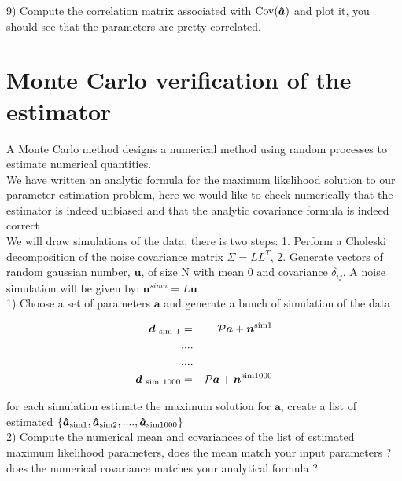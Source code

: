 \documentclass[a4paper]{article}
\def\ba{\begin{eqnarray}}
\def\ea{\end{eqnarray}}
\begin{document}
9) Compute the correlation matrix associated with ${\rm Cov}(\bm{\hat{a}}) $ and plot it, you should see that the parameters are pretty correlated.





\section{Monte Carlo verification of the estimator}

A Monte Carlo method designs a numerical method using random processes to estimate numerical quantities. \\

We have written an analytic formula for the maximum likelihood solution to our parameter estimation problem, here we would like to check numerically that the estimator is indeed unbiased and that the analytic covariance formula is indeed correct \\
We will draw simulations of the data,  there is two steps: 1.  Perform a Choleski decomposition of the noise covariance matrix $\Sigma = LL^{T}$, 2. Generate vectors of random gaussian  number, ${\bm u}$, of size N with mean 0 and covariance $\delta_{ij}$. 
A noise simulation will be given by: ${\bm n}^{simu}= L {\bm u} $ \\

1)  Choose a set of parameters $\bm{a}$ and generate a bunch of simulation of the data 

\ba
{\bm d}_{\ \rm sim \ 1} &=& {\cal P} \bm{a} + {\bm n}^{\rm sim 1} \\
&....& \nonumber \\
&....& \nonumber  \\
{\bm d}_{\ \rm sim \  1000} &=& {\cal P}\bm{a} + {\bm n}^{\rm sim 1000}
\ea

for each simulation estimate the maximum solution for  $\bm{a}$, create a list of estimated $\{ \bm{\hat{a}}_{\rm sim 1}, \bm{\hat{a}}_{\rm sim 2}, ...., \bm{\hat{a}}_{\rm sim 1000} \}$ \\

2) Compute the numerical mean and covariances of the list of estimated maximum likelihood parameters, does the mean match your input parameters ? does the numerical covariance matches your analytical formula ? \\
\end{document}
